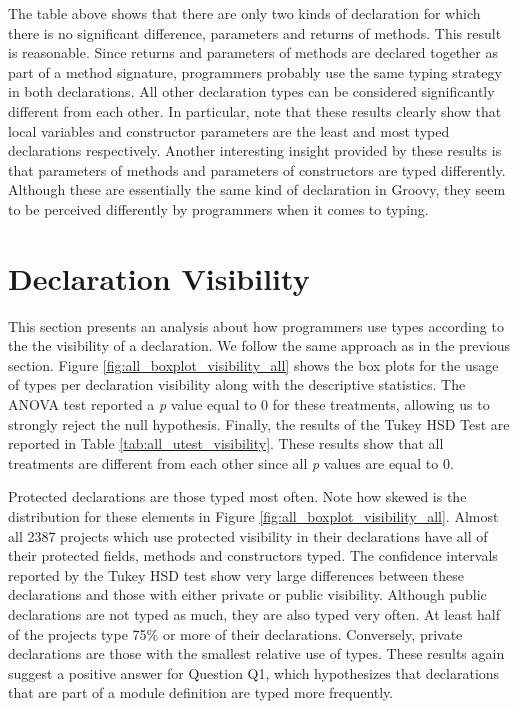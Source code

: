 \documentclass[msc]{ppgccufmg}
\begin{document}
The table above shows that there are only two kinds of declaration for which there is no significant difference, parameters and returns of methods.
This result is reasonable.
Since returns and parameters of methods are declared together as part of a method signature, programmers probably use the same typing strategy in both declarations.
All other declaration types can be considered significantly different from each other.
In particular, note that these results clearly show that local variables and constructor parameters are the least and most typed declarations respectively.
Another interesting insight provided by these results is that parameters of methods and parameters of constructors are typed differently.
Although these are essentially the same kind of declaration in Groovy, they seem to be perceived differently by programmers when it comes to typing.




\section{Declaration Visibility\label{sec:results-visibility}}

This section presents an analysis about how programmers use types according to the the visibility of a declaration.
We follow the same approach as in the previous section.
Figure \ref{fig:all_boxplot_visibility_all} shows the box plots for the usage of types per declaration visibility along with the descriptive statistics.
The ANOVA test reported a \emph{p} value equal to 0 for these treatments, allowing us to strongly reject the null hypothesis.
Finally, the results of the Tukey HSD Test are reported in Table \ref{tab:all_utest_visibility}.
These results show that all treatments are different from each other since all \emph{p} values are equal to 0.


Protected declarations are those typed most often.
Note how skewed is the distribution for these elements in Figure \ref{fig:all_boxplot_visibility_all}.
Almost all 2387 projects which use protected visibility in their declarations have all of their protected fields, methods and constructors typed.
The confidence intervals reported by the Tukey HSD test show very large differences between these declarations and those with either private or public visibility.
Although public declarations are not typed as much, they are also typed very often.
At least half of the projects type 75\% or more of their declarations.
Conversely, private declarations are those with the smallest relative use of types.
These results again suggest a positive answer for Question Q1, which hypothesizes that declarations that are part of a module definition are typed more frequently.
\end{document}
